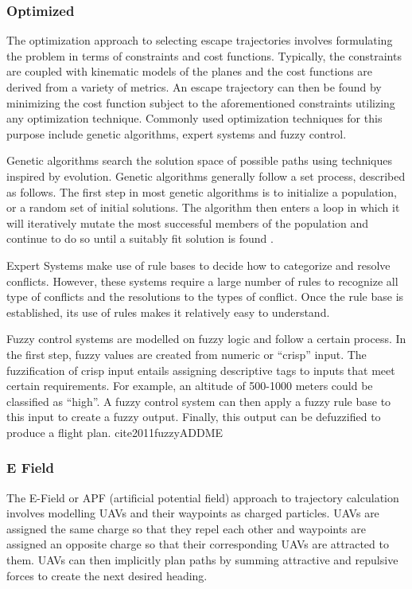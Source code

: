 \documentclass[conference]{IEEEtran}
\begin{document}
\subsubsection{Optimized}


The optimization approach to selecting escape trajectories involves formulating the problem in terms of constraints and cost functions.  Typically, the constraints are coupled with kinematic models of the planes and the cost functions are derived from a variety of metrics.  An escape trajectory can then be found by minimizing the cost function subject to the aforementioned constraints utilizing any optimization technique. Commonly used optimization techniques for this purpose include genetic algorithms, expert systems and fuzzy control.

Genetic algorithms search the solution space of possible paths using techniques inspired by evolution.  Genetic algorithms generally follow a set process, described as follows.  The first step in most genetic algorithms is to initialize a population, or a random set of initial solutions.  The algorithm then enters a loop in which it will iteratively mutate the most successful members of the population and continue to do so until a suitably fit solution is found \cite{siudynamic}.

Expert Systems make use of rule bases to decide how to categorize and resolve conflicts.  However, these systems require a large number of rules to recognize all type of conflicts and the resolutions to the types of conflict.  Once the rule base is established, its use of rules makes it relatively easy to understand. \cite{kuchar2000review}

Fuzzy control systems are modelled on fuzzy logic and follow a certain process.  In the first step, fuzzy values are created from numeric or “crisp” input.  The fuzzification of crisp input entails assigning descriptive tags to inputs that meet certain requirements.  For example, an altitude of 500-1000 meters could be classified as “high”.  A fuzzy control system can then apply a fuzzy rule base to this input to create a fuzzy output.  Finally, this output can be defuzzified to produce a flight plan. cite{2011fuzzyADDME}

\subsubsection{E Field}

The E-Field or APF (artificial potential field) approach to trajectory calculation involves modelling UAVs and their waypoints as charged particles.  UAVs are assigned the same charge so that they repel each other and waypoints are assigned an opposite charge so that their corresponding UAVs are attracted to them.  UAVs can then implicitly plan paths by summing attractive and repulsive forces to create the next desired heading.
\end{document}
